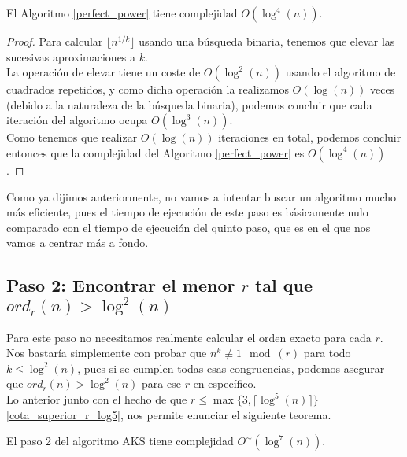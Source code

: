 \begin{teorema}
	El Algoritmo \ref{perfect_power} tiene complejidad $O(\log^4(n))$.
\end{teorema}

\begin{proof}
	Para calcular $\lfloor n^{1/k} \rfloor$ usando una búsqueda binaria, tenemos que elevar las sucesivas aproximaciones a $k$.\\
	
	La operación de elevar tiene un coste de $O(\log^2(n))$ usando el algoritmo de cuadrados repetidos, y como dicha operación la realizamos $O(\log(n))$ veces (debido a la naturaleza de la búsqueda binaria), podemos concluir que cada iteración del algoritmo ocupa $O(\log^3(n))$.\\
	
	Como tenemos que realizar $O(\log(n))$ iteraciones en total, podemos concluir entonces que la complejidad del Algoritmo \ref{perfect_power} es $O(\log^4(n))$.
\end{proof}

Como ya dijimos anteriormente, no vamos a intentar buscar un algoritmo mucho más eficiente, pues el tiempo de ejecución de este paso es básicamente nulo comparado con el tiempo de ejecución del quinto paso, que es en el que nos vamos a centrar más a fondo.

\subsection{Paso 2: Encontrar el menor $r$ tal que $ord_r(n) > \log^2(n)$}

Para este paso no necesitamos realmente calcular el orden exacto para cada $r$. Nos bastaría simplemente con probar que $n^k \not\equiv 1 \mod(r)$ para todo $k \leq \log^2(n)$, pues si se cumplen todas esas congruencias, podemos asegurar que $ord_r(n) > \log^2(n)$ para ese $r$ en específico.\\

Lo anterior junto con el hecho de que $r \leq \max\{3, \lceil \log^5(n) \rceil\}$ \ref{cota_superior_r_log5}, nos permite enunciar el siguiente teorema.

\begin{teorema}
	El paso 2 del algoritmo AKS tiene complejidad $O^\sim(\log^7(n))$.
\end{teorema}

